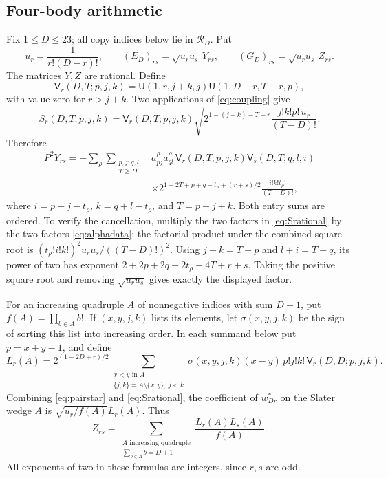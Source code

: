 \subsection{Four-body arithmetic}
\label{app:four-arithmetic}
Fix $1\le D\le23$; all copy indices below lie in $\mathcal R_D$. Put
\[
 u_r=\frac1{r!(D-r)!},\qquad
 (E_D)_{rs}=\sqrt{u_ru_s}\,Y_{rs},\qquad
 (G_D)_{rs}=\sqrt{u_ru_s}\,Z_{rs}.
\]
The matrices $Y,Z$ are rational. Define
\[
 \mathsf V_r(D,T;p,j,k)=
 \mathsf U(1,r,j+k,j)\mathsf U(1,D-r,T-r,p),
\]
with value zero for $r>j+k$. Two applications of \eqref{eq:coupling} give
\begin{equation}\label{eq:Srational}
 S_r(D,T;p,j,k)=\mathsf V_r(D,T;p,j,k)
 \sqrt{2^{1-(j+k)-T+r}\frac{j!k!p!\,u_r}{(T-D)!}}.
\end{equation}
Therefore
\begin{equation}\label{eq:Yrational}
 \begin{split}
 P^2Y_{rs}=-\sum_\rho\sum_{\substack{p,j;q,l\\T\ge D}}
 &a^\rho_{pj}a^\rho_{ql}\,
 \mathsf V_r(D,T;p,j,k)\mathsf V_s(D,T;q,l,i)\\
 &\times2^{1-2T+p+q-t_\rho+(r+s)/2}
       \frac{i!k!t_\rho!}{(T-D)!},
 \end{split}
\end{equation}
where $i=p+j-t_\rho$, $k=q+l-t_\rho$, and $T=p+j+k$. Both entry sums are ordered. To verify the cancellation, multiply the two factors in \eqref{eq:Srational} by the two factors \eqref{eq:alphadata}; the factorial product under the combined square root is
$(t_\rho!i!k!)^2u_ru_s/((T-D)!)^2$.
Using $j+k=T-p$ and $l+i=T-q$, its power of two has exponent
$2+2p+2q-2t_\rho-4T+r+s$. Taking the positive square root and
removing $\sqrt{u_ru_s}$ gives exactly the displayed factor.

For an increasing quadruple $A$ of nonnegative indices with sum $D+1$, put $f(A)=\prod_{b\in A}b!$. If $(x,y,j,k)$ lists its elements, let $\sigma(x,y,j,k)$ be the sign of sorting this list into increasing order. In each summand below put $p=x+y-1$, and define
\begin{equation}\label{eq:Lrational}
 L_r(A)=2^{(1-2D+r)/2}
 \sum_{\substack{x<y\text{ in }A\\\{j,k\}=A\setminus\{x,y\},\ j<k}}
 \sigma(x,y,j,k)(x-y)\,p!j!k!\,
 \mathsf V_r(D,D;p,j,k).
\end{equation}
Combining \eqref{eq:pairstar} and \eqref{eq:Srational}, the coefficient of $w_{Dr}^*$ on the Slater wedge $A$ is $\sqrt{u_r/f(A)}L_r(A)$. Thus
\begin{equation}\label{eq:Zrational}
 Z_{rs}=\sum_{\substack{A\text{ increasing quadruple}\\\sum_{b\in A}b=D+1}}
                   \frac{L_r(A)L_s(A)}{f(A)}.
\end{equation}
All exponents of two in these formulas are integers, since $r,s$ are odd.


